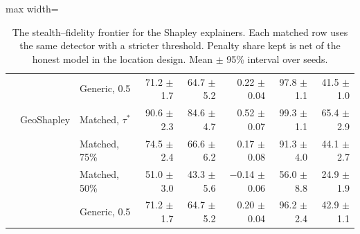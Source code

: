 \begin{table}[t]
\begin{adjustbox}{max width=\linewidth}
\begin{tabular}{lllrrrrr}
 &  & Generic, 0.5 & 71.2 $\pm$ 1.7 & 64.7 $\pm$ 5.2 & 0.22 $\pm$ 0.04 & 97.8 $\pm$ 1.1 & 41.5 $\pm$ 1.0 \\
 & GeoShapley & Matched, $\tau^*$ & 90.6 $\pm$ 2.3 & 84.6 $\pm$ 4.7 & 0.52 $\pm$ 0.07 & 99.3 $\pm$ 1.1 & 65.4 $\pm$ 2.9 \\
 &  & Matched, 75\% & 74.5 $\pm$ 2.4 & 66.6 $\pm$ 6.2 & 0.17 $\pm$ 0.08 & 91.3 $\pm$ 4.0 & 44.1 $\pm$ 2.7 \\
 &  & Matched, 50\% & 51.0 $\pm$ 3.0 & 43.3 $\pm$ 5.6 & $-$0.14 $\pm$ 0.06 & 56.0 $\pm$ 8.8 & 24.9 $\pm$ 1.9 \\
 &  & Generic, 0.5 & 71.2 $\pm$ 1.7 & 64.7 $\pm$ 5.2 & 0.20 $\pm$ 0.04 & 96.2 $\pm$ 2.4 & 42.9 $\pm$ 1.1 \\
\bottomrule
\end{tabular}
\end{adjustbox}
\caption{The stealth--fidelity frontier for the Shapley explainers. Each matched row uses the same detector with a stricter threshold. Penalty share kept is net of the honest model in the location design. Mean $\pm$ 95\% interval over seeds.}
\label{tab:frontier}
\end{table}
